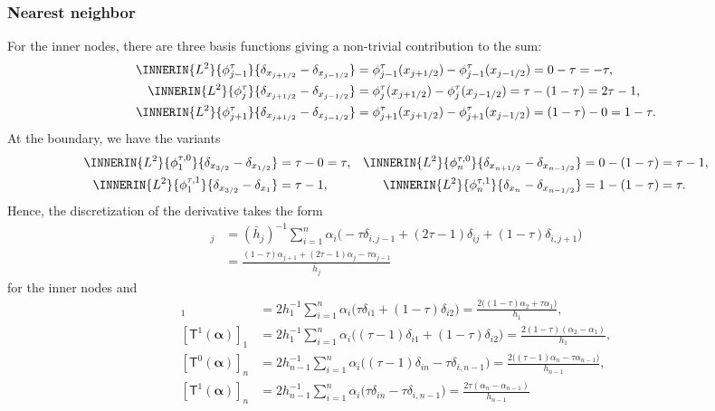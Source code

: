 \documentclass[a4paper]{paper}
\newcommand{\DISCOP}[1]{{\ensuremath{\mathsf{#1}}}}
\newcommand*{\DISCOPT}{\DISCOP{T}}
\newcommand*{\BDalpha}{\boldsymbol{\alpha}}
\begin{document}
\subsubsection{Nearest neighbor}
\label{subsec:specif:deriv:nn}

For the inner nodes, there are three basis functions giving a non-trivial contribution to the sum:
%
\begin{align*}
 \INNERIN{L^2}{\phi^\tau_{j-1}}{\delta_{x_{j+1/2}} - \delta_{x_{j-1/2}}}
 &= \phi^\tau_{j-1}(x_{j+1/2}) - \phi^\tau_{j-1}(x_{j-1/2}) = 0 - \tau = -\tau, \\
 \INNERIN{L^2}{\phi^\tau_j}{\delta_{x_{j+1/2}} - \delta_{x_{j-1/2}}}
 &= \phi^\tau_j(x_{j+1/2}) - \phi^\tau_j(x_{j-1/2}) = \tau - (1 - \tau) = 2\tau - 1, \\
 \INNERIN{L^2}{\phi^\tau_{j+1}}{\delta_{x_{j+1/2}} - \delta_{x_{j-1/2}}}
 &= \phi^\tau_{j+1}(x_{j+1/2}) - \phi^\tau_{j+1}(x_{j-1/2}) = (1 - \tau) - 0 = 1 - \tau.
\end{align*}
%
At the boundary, we have the variants
%
\begin{align*}
 \INNERIN{L^2}{\phi^{\tau, 0}_{1}}{\delta_{x_{3/2}} - \delta_{x_{1/2}}}
 &= \tau - 0 = \tau, &
 \INNERIN{L^2}{\phi^{\tau, 0}_{n}}{\delta_{x_{n+1/2}} - \delta_{x_{n-1/2}}}
 &= 0 - (1 - \tau) = \tau - 1, \\
 \INNERIN{L^2}{\phi^{\tau, 1}_{1}}{\delta_{x_{3/2}} - \delta_{x_1}}
 &= \tau - 1, &
 \INNERIN{L^2}{\phi^{\tau, 1}_{n}}{\delta_{x_{n}} - \delta_{x_{n-1/2}}}
 &= 1 - (1 - \tau) = \tau.
\end{align*}
%
Hence, the discretization of the derivative takes the form
%
\begin{align*}
 [\DISCOPT(\BDalpha)]_j 
 &= (\bar h_j)^{-1} \sum_{i=1}^n 
  \alpha_i \big( -\tau \delta_{i,j-1} + (2\tau - 1)\delta_{ij} + (1-\tau)\delta_{i,j+1} \big) \\
 &= \frac{(1-\tau) \alpha_{j+1}  + (2\tau - 1) \alpha_j - \tau \alpha_{j-1}}{\bar h_j}
\end{align*}
%
for the inner nodes and
%
\begin{align*}
 [\DISCOPT^0(\BDalpha)]_1 
 &= 2h_1^{-1} \sum_{i=1}^n
  \alpha_i \big( \tau \delta_{i1} + (1-\tau) \delta_{i2} \big) 
 = \frac{2\big( (1-\tau)\alpha_2 + \tau \alpha_1\big)}{h_1}, \\
 [\DISCOPT^1(\BDalpha)]_1 
 &= 2h_1^{-1} \sum_{i=1}^n
  \alpha_i \big( (\tau-1) \delta_{i1} + (1-\tau) \delta_{i2} \big) 
 = \frac{2(1-\tau)(\alpha_2 - \alpha_1)}{h_1}, \\
 [\DISCOPT^0(\BDalpha)]_n
 &= 2h_{n-1}^{-1} \sum_{i=1}^n
  \alpha_i \big( (\tau-1) \delta_{in} -\tau \delta_{i,n-1} \big) 
 = \frac{2\big( (\tau - 1)\alpha_n - \tau \alpha_{n-1}\big)}{h_{n-1}}, \\
 [\DISCOPT^1(\BDalpha)]_n
 &= 2h_{n-1}^{-1} \sum_{i=1}^n
  \alpha_i \big( \tau \delta_{in} -\tau \delta_{i,n-1} \big) 
 = \frac{2\tau (\alpha_n - \alpha_{n-1})}{h_{n-1}}
\end{align*}
\end{document}

